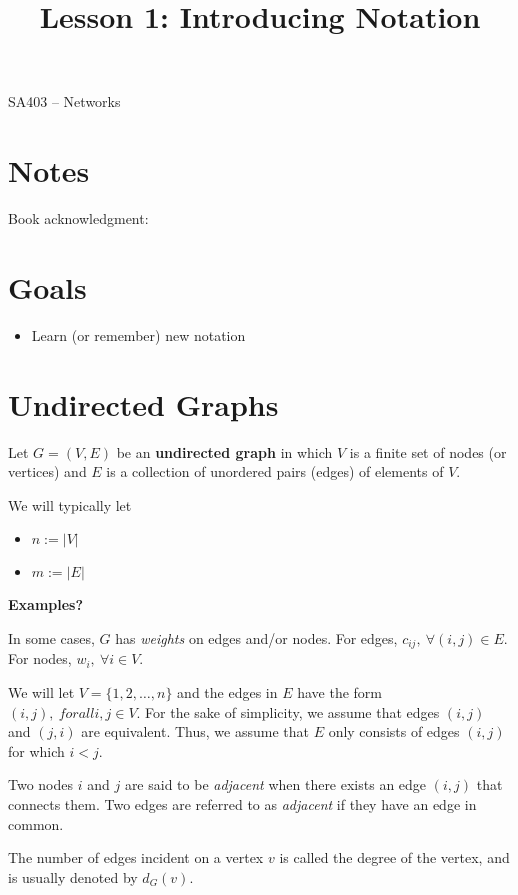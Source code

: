 \documentclass[12pt]{article}
\makeatletter
\theoremstyle{definition}
\newcommand{\graphbox}[5]%
{
\begin{tikzpicture}
     [>=latex,scale=#5]
     
     \draw [->,very thick] (#1, 0) -- (#2, 0) node[right] {$x$};
     \draw [->,very thick] (0, #3) -- (0, #4) node[above] {$y$};
     
     \draw[step=1cm,thick,dotted] (#1,#3) grid (#2,#4);
   \end{tikzpicture}
   }
\renewcommand{\maketitle}{
  \noindent SA403 -- Networks \\

  \begin{center}\Large{\textbf{\@title}}\end{center}
}
\makeatother
\begin{document}

\title{Lesson 1: Introducing Notation}


\maketitle


\section*{Notes}

Book acknowledgment:
\section*{Goals}
\begin{itemize}
\item  Learn (or remember) new notation
\end{itemize}

\section{Undirected Graphs}

Let $G = (V,E)$ be an \textbf{undirected graph} in which $V$ is a finite set of nodes (or vertices) and $E$ is a collection of unordered pairs (edges) of elements of $V$.

We will typically let	
\begin{itemize}
	\item $n:= |V|$
	\item $m:=|E|$
\end{itemize}

\textbf{Examples?}

In some cases, $G$ has \emph{weights} on edges and/or nodes. For edges, $c_{ij}, \ \forall (i,j) \in E$. For nodes, $w_i, \ \forall i \in V$.

We will let $V= \{1,2, \dots, n\}$ and the edges in $E$ have the form $(i,j), \ forall i,j \in V$. For the sake of simplicity, we assume that edges $(i,j)$ and $(j,i)$ are equivalent. Thus, we assume that $E$ only consists of edges $(i,j)$ for which $i<j$.

Two nodes $i$ and $j$ are said to be \emph{adjacent} when there exists an edge $(i,j)$ that connects them. Two edges are referred to as \emph{adjacent} if they have an edge in common.

The number of edges incident on a vertex $v$ is called the degree of the vertex, and is usually denoted by $d_G(v)$. 
\end{document}
